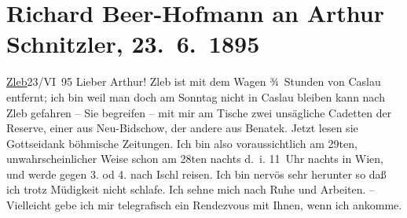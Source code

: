 

         
         \newcommand{\erwaehntePersonen}{Personen: Hermann Bahr, Max Eugen Burckhard, Karl Lueger}
         \newcommand{\erwaehnteInstitutionen}{}
         \newcommand{\erwaehnteOrte}{Orte: Bad Ischl, Benatek, Böhmen, Caslau, Nový Bydžov, Schleb, Wien}
         \newcommand{\erwaehnteWerke}{Werke: Später Ruhm}
               \section[Richard Beer-Hofmann an Arthur Schnitzler, 23. 6. 1895]{ Richard Beer-Hofmann an Arthur Schnitzler, 23. 6. 1895}\nopagebreak{}\rehead{ }\begin{ledgroupsized}[t]{13cm}\normalsize\beginnumbering \toendnotes[C]{\smallbreak\pagebreak[2]} 
\pstart
           {\pb}\uline{Zleb}23/VI 95\pend
           \pstart
           Lieber Arthur! Zleb ist mit
                    dem Wagen ¾ Stunden von Caslau entfernt; ich
                    bin weil man doch am Sonntag nicht in Caslau bleiben kann nach Zleb gefahren – Sie begreifen – mit mir am Tische zwei
                    unsägliche Cadetten der Reserve, einer aus Neu-Bidschow, der andere {\pb}aus Benatek. Jetzt lesen sie Gottseidank böhmische Zeitungen.\pend
           \pstart
           Ich bin also voraussichtlich am 29ten, unwahrscheinlicher Weise
                    schon am 28ten{ }nachts d. i. 11 Uhr nachts in Wien, und werde gegen 3. od 4. nach
                        Ischl reisen. Ich bin nervös sehr
                    herunter {\pb}so daß ich trotz
                    Müdigkeit nicht schlafe. Ich sehne mich nach Ruhe und Arbeiten. –\pend
           \pstart
           Vielleicht gebe ich mir telegrafisch ein Rendezvous mit Ihnen, wenn ich ankomme.

\end{ledgroupsized}
